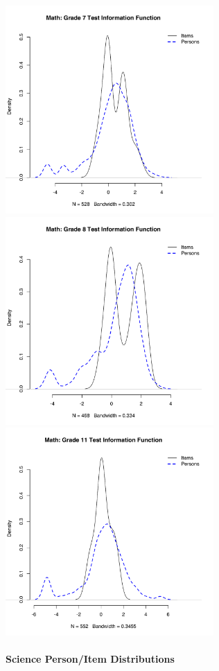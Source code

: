 \documentclass[]{article}
\let\oldparagraph\paragraph
\renewcommand{\paragraph}[1]{\oldparagraph{#1}\mbox{}}
\begin{document}
\includegraphics[width=\textwidth,height=3.125in]{ipdens/math7ipdens.pdf}
\includegraphics[width=\textwidth,height=3.125in]{ipdens/math8ipdens.pdf}
\includegraphics[width=\textwidth,height=3.125in]{ipdens/math11ipdens.pdf}
\clearpage

\hypertarget{science-personitem-distributions}{%
\paragraph{Science Person/Item
Distributions}\label{science-personitem-distributions}}
\end{document}
